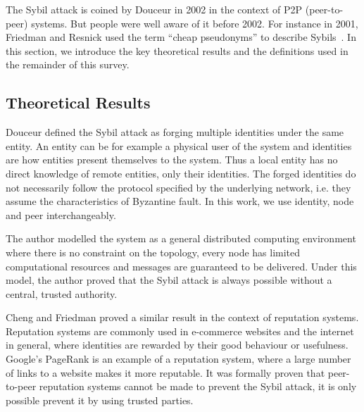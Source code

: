 The Sybil attack is coined by Douceur\cite{douceur2002sybil} in 2002 in the
context of P2P (peer-to-peer) systems. But people were well aware of it before
2002. For instance in 2001, Friedman and Resnick used the term ``cheap
pseudonyms'' to describe Sybils~\cite{resnick2001social}. In this section, we
introduce the key theoretical results and the definitions used in the remainder
of this survey.

\subsection{Theoretical Results}\label{sec:sybil-theory}
Douceur defined the Sybil attack as forging multiple identities under the same
entity\cite{douceur2002sybil}. An entity can be for example a physical user of
the system and identities are how entities present themselves to the system.
Thus a local entity has no direct knowledge of remote entities, only their
identities. The forged identities do not necessarily follow the protocol
specified by the underlying network, i.e. they assume the characteristics of
Byzantine fault\cite{lamport1982byzantine}. In this work, we use identity, node
and peer interchangeably.

The author modelled the system as a general distributed computing environment
where there is no constraint on the topology, every node has limited
computational resources and messages are guaranteed to be delivered. Under this
model, the author proved that the Sybil attack is always possible without a
central, trusted authority.


Cheng and Friedman proved a similar result in the context of reputation
systems\cite{cheng2005sybilproof}. Reputation systems are commonly used in
e-commerce websites and the internet in general, where identities are rewarded
by their good behaviour or usefulness. Google's PageRank\cite{page1999pagerank}
is an example of a reputation system, where a large number of links to a website
makes it more reputable. It was formally proven that peer-to-peer reputation
systems cannot be made to prevent the Sybil attack, it is only possible prevent
it by using trusted parties.

